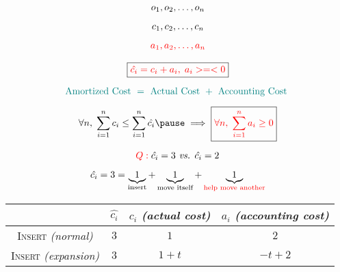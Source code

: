 
\begin{frame}{}
  \centerline{}

  \vspace{-0.50cm}
  \begin{gather*}
    o_1, o_2, \ldots, o_n \\[5pt]
    c_1, c_2, \ldots, c_n \\[5pt]
    \textcolor{red}{a_1, a_2, \ldots, a_n}
  \end{gather*}

  \pause
  \vspace{-0.30cm}
  \[
    \boxed{\textcolor{red}{\hat{c_i} = c_i + a_i, \; a_i >=< 0}}
  \]

  \[
    \textcolor{teal}{\text{Amortized Cost } = \text{ Actual Cost } + \text{ Accounting Cost }}
  \]

  \pause
  \[
    \forall n,\; \sum_{i=1}^{n} c_i \le \sum_{i=1}^{n} \hat{c_i} \pause \implies \boxed{\red{\forall n,\; \sum_{i=1}^{n} a_i \geq 0}}
  \]

  \pause
  \begin{center}
    {\large {}}
  \end{center}
\end{frame}

\begin{frame}{}
  \centerline{}

  \[
    \textcolor{red}{Q:}\; \hat{c_i} = 3 \text{\emph{ vs. }} \hat{c_i} = 2
  \]

  \pause
  \[
    \hat{c_i} = 3 = \underbrace{1}_{\textrm{insert}} +
    \underbrace{1}_{\textrm{move itself}} + \underbrace{1}_{\textrm{\textcolor{red}{help move another}}}
  \]

  \pause
  \vspace{0.30cm}
  \begin{table}
    \begin{tabular}{c|ccc}
      & $\hat{c_i}$ & $c_i$ {\it (actual cost)} & $a_i$ {\it (accounting cost)}
      \\ \hline
      \textsc{Insert} {\it (normal)} & $3$ & $1$ & $2$\\
      \textsc{Insert} {\it (expansion)} & $3$ & $1 + t$ & $-t + 2$
    \end{tabular}
  \end{table}
\end{frame}

